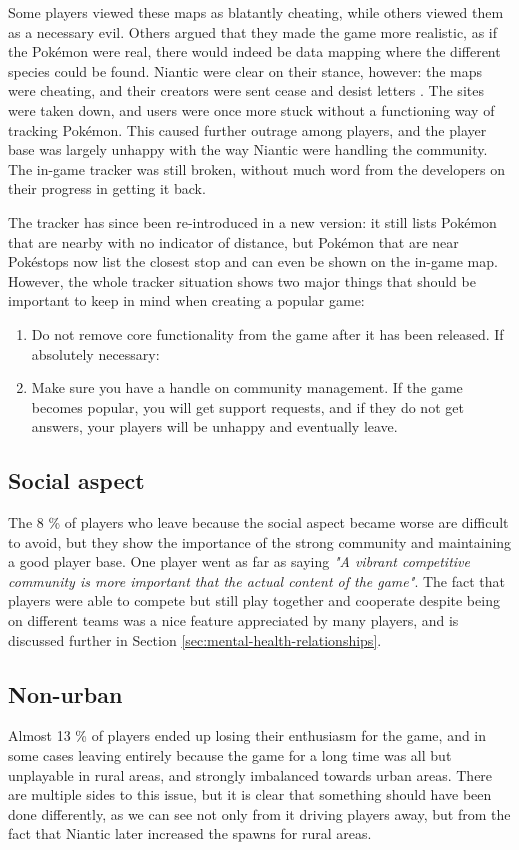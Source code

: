 Some players viewed these maps as blatantly cheating, while others viewed them as a necessary evil. Others argued that they made the game more realistic, as if the Pokémon were real, there would indeed be data mapping where the different species could be found. Niantic were clear on their stance, however: the maps were cheating, and their creators were sent cease and desist letters . The sites were taken down, and users were once more stuck without a functioning way of tracking Pokémon. This caused further outrage among players, and the player base was largely unhappy with the way Niantic were handling the community. The in-game tracker was still broken, without much word from the developers on their progress in getting it back.

The tracker has since been re-introduced in a new version: it still lists Pokémon that are nearby with no indicator of distance, but Pokémon that are near Pokéstops now list the closest stop and can even be shown on the in-game map. However, the whole tracker situation shows two major things that should be important to keep in mind when creating a popular game:

\begin{enumerate}
	\item Do not remove core functionality from the game after it has been released. If absolutely necessary:
	\item Make sure you have a handle on community management. If the game becomes popular, you will get support requests, and if they do not get answers, your players will be unhappy and eventually leave.
\end{enumerate}

\subsection{Social aspect}
\label{sec:success-factors-social}
The 8 \% of players who leave because the social aspect became worse are difficult to avoid, but they show the importance of the strong community and maintaining a good player base. One player went as far as saying \emph{"A vibrant competitive community is more important that the actual content of the game"}. The fact that players were able to compete but still play together and cooperate despite being on different teams was a nice feature appreciated by many players, and is discussed further in Section \ref{sec:mental-health-relationships}.

\subsection{Non-urban}
\label{sec:the-rural-problem}
Almost 13 \% of players ended up losing their enthusiasm for the game, and in some cases leaving entirely because the game for a long time was all but unplayable in rural areas, and strongly imbalanced towards urban areas. There are multiple sides to this issue, but it is clear that something should have been done differently, as we can see not only from it driving players away, but from the fact that Niantic later increased the spawns for rural areas.

